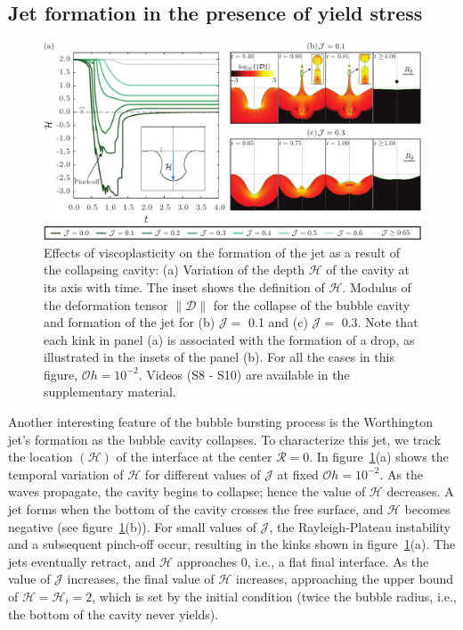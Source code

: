 \documentclass[final]{jfm}
\begin{document}
\subsection{Jet formation in the presence of yield stress}\label{Sec::JetFormation}
 \begin{figure}
	\centerline{\includegraphics[width=\linewidth]{Figure4_LateTimes-eps-converted-to.pdf}}%
	\caption{Effects of viscoplasticity on the formation of the jet as a result of the collapsing cavity: (a) Variation of the depth $\mathcal{H}$ of the cavity at its axis with time. The inset shows the definition of $\mathcal{H}$. Modulus of the deformation tensor $\|\boldsymbol{\mathcal{D}}\|$ for the collapse of the bubble cavity and formation of the jet for (b) $\mathcal{J} =$  0.1 and (c) $\mathcal{J} =$ 0.3. Note that each kink in panel (a) is associated with the formation of a drop, as illustrated in the insets of the panel (b). For all the cases in this figure, $\mathcal{O}h = 10^{-2}$. Videos (S8 - S10) are available in the supplementary material.}
	\label{fig:Jcar_LateTimes}
\end{figure}
Another interesting feature of the bubble bursting process is the Worthington jet's formation as the bubble cavity collapses. To characterize this jet, we track the location $\left(\mathcal{H}\right)$ of the interface at the center $\mathcal{R} = 0$. 
In figure~\ref{fig:Jcar_LateTimes}(a) shows the temporal variation of $\mathcal{H}$ for different values of $\mathcal{J}$ at fixed $\mathcal{O}h = 10^{-2}$. As the waves propagate, the cavity begins to collapse; hence the value of $\mathcal{H}$ decreases. A jet forms when the bottom of the cavity crosses the free surface, and $\mathcal{H}$ becomes negative (see figure~\ref{fig:Jcar_LateTimes}(b)). For small values of $\mathcal{J}$, the Rayleigh-Plateau instability and a subsequent pinch-off occur, resulting in the kinks shown in figure~\ref{fig:Jcar_LateTimes}(a). The jets eventually retract, and $\mathcal{H}$ approaches $0$, i.e., a flat final interface. As the value of $\mathcal{J}$ increases, the final value of $\mathcal{H}$ increases, approaching the upper bound of $\mathcal{H} = \mathcal{H}_i = 2$, which is set by the initial condition (twice the bubble radius, i.e., the bottom of the cavity never yields). 
\end{document}
